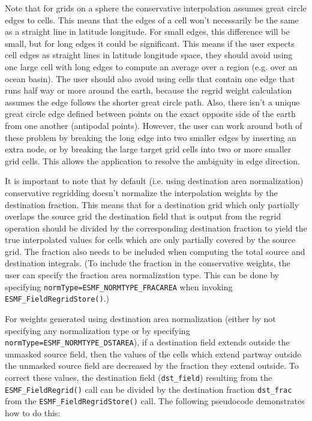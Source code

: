  Note that for grids on a sphere the conservative interpolation assumes great circle edges to cells. This means that the
 edges of a cell won't necessarily be
 the same as a straight line in latitude longitude. For small edges, this difference will be small, but for long edges it
 could be significant. This means if
 the user expects cell edges as straight lines in latitude longitude space, they should avoid using one large cell with 
 long edges to compute an average over a region (e.g. over an ocean basin). The 
 user should also avoid using cells that contain one edge that runs half way or more around the earth, because the 
 regrid weight calculation assumes the 
 edge follows the shorter great circle path. Also, there isn't a unique great circle edge defined between points on the 
 exact opposite side of the earth from one another (antipodal points). 
 However, the user can work around both of these problem by breaking the long edge into two smaller edges by inserting 
 an extra node, or by breaking the large target grid cells 
 into two or more smaller grid cells. This allows the application to resolve the ambiguity in edge direction. 

 It is important to note that by default (i.e. using destination area normalization) 
conservative regridding doesn't normalize the interpolation weights by the destination fraction. 
This means that for a destination grid which only partially overlaps the source grid
the destination field that is output from the regrid operation 
should be divided by the corresponding destination fraction to yield the 
true interpolated values for cells which are only partially covered by the source grid. 
The fraction also needs to be included when computing the total source and destination integrals. 
(To include the fraction in the conservative weights, the user can specify 
the fraction area normalization type. This can be done by specifying {\tt normType=ESMF\_NORMTYPE\_FRACAREA} when
invoking {\tt ESMF\_FieldRegridStore()}.)

For weights generated using destination area normalization (either by not specifying any normalization type or by specifying {\tt normType=ESMF\_NORMTYPE\_DSTAREA}), if a destination field extends 
outside the unmasked source field, then the values of the cells which 
extend partway outside the unmasked source field are decreased by the fraction they extend outside. 
To correct these values, the destination field ({\tt dst\_field}) resulting
from the {\tt ESMF\_FieldRegrid()} call can be divided by the destination fraction {\tt dst\_frac} 
from the {\tt ESMF\_FieldRegridStore()} call. The following pseudocode demonstrates  how to do this:

